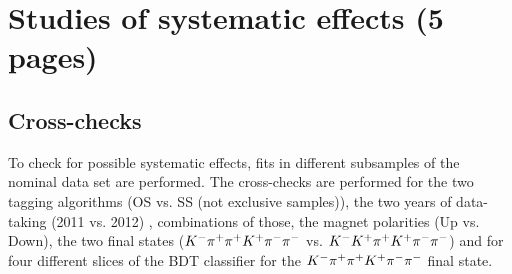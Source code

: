 
\section{Studies of systematic effects (5 pages)}
\label{sec:b02dd:systematics}

\subsection{Cross-checks}
\label{sec:b02dd:systematics:xchecks}
To check for possible systematic effects, fits in different subsamples of the
nominal data set are performed. The cross-checks are performed for the two
tagging algorithms (OS vs. SS (not exclusive samples)), the two years of
data-taking (2011 vs. 2012) , combinations of those, the magnet polarities (Up
vs. Down), the two final states (${{K}^-}{{\pi}^+}{{\pi}^+}{{K}^+}{{\pi}^-}{{\pi}^-}$ vs. ${{K}^-}{{K}^+}{{\pi}^+}{{K}^+}{{\pi}^-}{{\pi}^-}$) and for four
different slices of the BDT classifier for the ${{K}^-}{{\pi}^+}{{\pi}^+}{{K}^+}{{\pi}^-}{{\pi}^-}$ final state.

